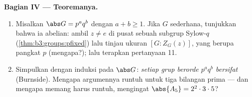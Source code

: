 \begin{problem}
\medskip
\noindent\textbf{Bagian IV --- Teoremanya.}
\begin{enumerate}[resume]
  \item Misalkan $\abs G = p^aq^b$ dengan $a + b \geq 1$. Jika $G$
        sederhana, tunjukkan bahwa ia abelian: ambil $z \neq e$ di
        pusat sebuah subgrup Sylow-$q$
        (\cref{thm:b3:groups:pfixed}) lalu tinjau ukuran
         $[G : Z_G(z)]$, yang berupa pangkat $p$
        (mengapa?); lalu terapkan pertanyaan 11.
  \item Simpulkan dengan induksi pada $\abs G$: \emph{setiap grup
        berorde $p^aq^b$ bersifat } (Burnside). Mengapa
        argumennya runtuh untuk tiga bilangan prima --- dan mengapa memang harus runtuh, mengingat
        $\abs{A_5} = 2^2\cdot3\cdot5$?
\end{enumerate}


\end{problem}
